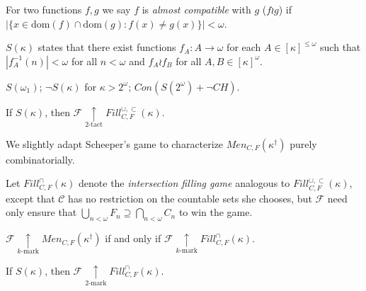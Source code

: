 \documentclass{beamer}
\theoremstyle{definition}
\newcommand{\kmarkwin}[1]{\underset{#1\text{-mark}}{\uparrow}}
\newcommand{\ktactwin}[1]{\underset{#1\text{-tact}}{\uparrow}}
\newcommand{\oneptlind}[1]{#1^\dagger}
\newcommand{\mengame}[1]{Men_{C,F}(#1)}
\newcommand{\fillgameS}[1]{Fill^{\cup,\subset}_{C,F}(#1)}
\newcommand{\fillgameInt}[1]{Fill^{\cap}_{C,F}(#1)}
\newcommand{\<}{\langle}
\renewcommand{\>}{\rangle}
\newcommand{\alcomp}{\wr}
\newcommand{\dom}{\textrm{dom}}
\newcommand{\alcompS}[1]{S(#1)}
\newcommand{\pl}[1]{\mathscr{#1}}
\newcommand{\term}{\textit}
\begin{document}
\begin{frame}
  \begin{definition}
    For two functions $f,g$ we say $f$ is \term{almost compatible} with
    $g$ ($f\alcomp g$) if $|\{x\in\dom(f)\cap\dom(g):f(x)\not=g(x)\}|<\omega$.
  \end{definition}
  \pause
  \begin{definition}
    $\alcompS\kappa$ states that there exist functions
    $f_A:A\to\omega$ for each $A\in[\kappa]^{\leq\omega}$ such that
    $|f_A^{-1}(n)|<\omega$ for all $n<\omega$ and
    $f_A\alcomp f_B$ for all $A,B\in[\kappa]^\omega$.
  \end{definition}
  \pause
  \begin{theorem}[Scheepers 1991]
    $\alcompS{\omega_1}$;
    $\neg\alcompS\kappa$ for $\kappa>2^\omega$;
    $Con(\alcompS{2^\omega}+\neg CH)$.
  \end{theorem}
\end{frame}

\begin{frame}
  \begin{theorem}[Scheepers 1991]
    If $\alcompS\kappa$, then $\pl F\ktactwin2 \fillgameS\kappa$.
  \end{theorem}

  \pause

  We slightly adapt Scheeper's game to characterize
  $\mengame{\oneptlind\kappa}$ purely combinatorially.

  \begin{definition}
    Let $\fillgameInt\kappa$ denote the \term{intersection filling game}
    analogous to $\fillgameS\kappa$, except that $\pl C$ has no restriction
    on the countable sets she chooses, but $\pl F$ need only ensure that
    $\bigcup_{n<\omega} F_n\supseteq \bigcap_{n<\omega} C_n$ to win
    the game.
  \end{definition}
\end{frame}

\begin{frame}
  \begin{theorem}
    $\pl F \kmarkwin{k} \mengame{\oneptlind\kappa}$ if and only if
    $\pl F \kmarkwin{k} \fillgameInt\kappa$.
  \end{theorem}

  \pause

  \begin{theorem}
    If $\alcompS\kappa$, then $\pl F\kmarkwin{2} \fillgameInt\kappa$.
  \end{theorem}
\end{frame}
\end{document}

